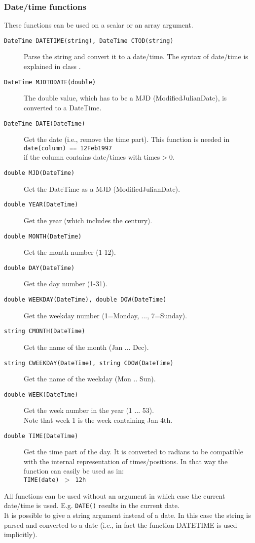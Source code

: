 \subsubsection{Date/time functions}
These functions can be used on a scalar or an array argument.
\begin{description}
  \item[ \texttt{DateTime DATETIME(string),  DateTime CTOD(string)} ]
       Parse the string and convert it to a date/time. The syntax of
       date/time is explained in class
       .
  \item[ \texttt{DateTime MJDTODATE(double)} ]
       The double value, which has to be a MJD (ModifiedJulianDate), is
       converted to a DateTime.
  \item[ \texttt{DateTime DATE(DateTime)}]
        Get the date (i.e., remove the time part). This function is needed in
       \\\texttt{date(column) == 12Feb1997}
       \\if the column contains date/times with times$>$0.
  \item[ \texttt{double MJD(DateTime)}]
        Get the DateTime as a MJD (ModifiedJulianDate).
  \item[ \texttt{double YEAR(DateTime)}]
        Get the year (which includes the century).
  \item[ \texttt{double MONTH(DateTime)}]
        Get the month number (1-12).
  \item[ \texttt{double DAY(DateTime)}]
        Get the day number (1-31).
  \item[ \texttt{double WEEKDAY(DateTime),  double DOW(DateTime)}]
        Get the weekday number (1=Monday, ..., 7=Sunday).
  \item[ \texttt{string CMONTH(DateTime)}]
        Get the name of the month (Jan ... Dec).
  \item[ \texttt{string CWEEKDAY(DateTime),  string CDOW(DateTime)}]
        Get the name of the weekday (Mon .. Sun).
  \item[ \texttt{double WEEK(DateTime)}]
        Get the week number in the year (1 ... 53).
        \\Note that week 1 is the week containing Jan 4th.
  \item[ \texttt{double TIME(DateTime)}]
       Get the time part of the day. It is converted to radians to
       be compatible with the internal representation of times/positions.
       In that way the function can easily be used as in:
       \\\texttt{TIME(date) $>$ 12h}
\end{description}
All functions can be used without an argument in which case the current
date/time is used. E.g. \texttt{DATE()} results in the current date.
\\It is possible to give a string argument instead of a date. In this
case the string is parsed and converted to a date (i.e., in fact the
function DATETIME is used implicitly).

